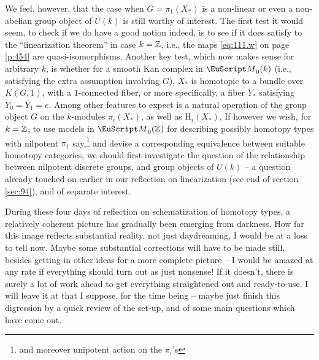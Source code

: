 We feel, however, that the case when $G=\pi_1(X_*)$ is a non-linear or
even a non-abelian group object of $U(k)$ is still worthy of
interest. The first test it would seem, to check if we do have a good
notion indeed, is to see if it does satisfy to the ``linearization
theorem'' in case $k={\mathbb{Z}}$, i.e., the maps \eqref{eq:111.w} on page
\ref{p:454} are quasi-isomorphisms. Another key test, which now makes
sense for arbitrary $k$, is whether for a smooth Kan complex in
$\scrM_0(k)$ (i.e., satisfying the extra assumption involving $G$),
$X_*$ is homotopic to a bundle over $K(G,1)$, with a $1$-connected
fiber, or more specifically, a fiber $Y_*$ satisfying
$Y_0=Y_1=e$. Among other features to expect is a natural operation of
the group object $G$ on the $k$-modules $\pi_i(X_*)$, as well as
$\mathrm H_i(X_*)$, If however we wish, for $k={\mathbb{Z}}$, to use models in
$\scrM_0(\bZ)$ for describing possibly homotopy types with nilpotent
$\pi_1$ say,\footnote{and moreover unipotent action on the $\pi_i$'s}
and devise a corresponding equivalence between suitable homotopy
categories, we should first investigate the question of the
relationship between nilpotent discrete groups, and group objects of
$U(k)$ -- a question already touched on earlier in our reflection on
linearization (see end of section \ref{sec:94}), and of separate
interest.

\label{sec:114}%
During these four days of reflection on schematization of homotopy
types, a relatively coherent picture has gradually been emerging from
darkness. How far this image reflects substantial reality, not just
daydreaming, I would be at a loss to tell now. Maybe some substantial
corrections will have to be made still, besides getting in other ideas
for a more complete picture -- I would be amazed at any rate if
everything should turn out as just nonsense! If it doesn't, there is
surely a lot of work ahead to get everything straightened out and
ready-to-use. I will leave it at that I suppose, for the time being --
maybe just finish this digression by a quick review of the set-up, and
of some main questions which have come out.

